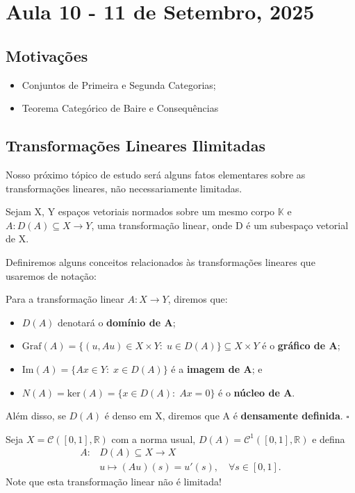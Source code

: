 \documentclass[../functional_analysis.tex]{subfiles}
\begin{document}
\section{Aula 10 - 11 de Setembro, 2025}
\subsection{Motivações}
\begin{itemize}
	\item Conjuntos de Primeira e Segunda Categorias;
	\item Teorema Categórico de Baire e Consequências
\end{itemize}
\subsection{Transformações Lineares Ilimitadas}

Nosso próximo tópico de estudo será alguns fatos elementares sobre as transformações lineares, não necessariamente limitadas.

Sejam X, Y espaços vetoriais normados sobre um mesmo corpo \(\mathbb{K}\) e \(A:D(A)\subseteq X\rightarrow Y\), uma transformação linear, onde D é um subespaço vetorial de X.

Definiremos alguns conceitos relacionados às transformações lineares que usaremos de notação:

\begin{def*}
	Para a transformação linear \(A:X\rightarrow Y\), diremos que:
	\begin{itemize}
		\item \(D(A)\) denotará o \textbf{domínio de A};
		\item \(\mathrm{Graf}(A) = \{(u, Au)\in X\times Y:\; u\in D(A)\}\subseteq X\times Y\) é o \textbf{gráfico de A};
		\item \(\mathrm{Im}(A)=\{Ax\in Y:\; x\in D(A)\}\) é a \textbf{imagem de A}; e
		\item \(N(A) = \mathrm{ker}(A) = \{x\in D(A):\; Ax = 0\}\) é o \textbf{núcleo de A}.
	\end{itemize}
	Além disso, se \(D(A)\) é denso em X, diremos que A é \textbf{densamente definida}. \(\square\)
\end{def*}

\begin{example}
	Seja \(X = \mathcal{C}([0, 1], \mathbb{R})\) com a norma usual, \(D(A) = \mathcal{C}^{1}([0, 1], \mathbb{R})\) e defina
	\begin{align*}
		A: & D(A)\subseteq X\rightarrow X                             \\
		   & u\longmapsto (Au)(s) = u'(s), \quad \forall s\in [0, 1].
	\end{align*}
	Note que esta transformação linear não é limitada!
\end{example}
\end{document}

